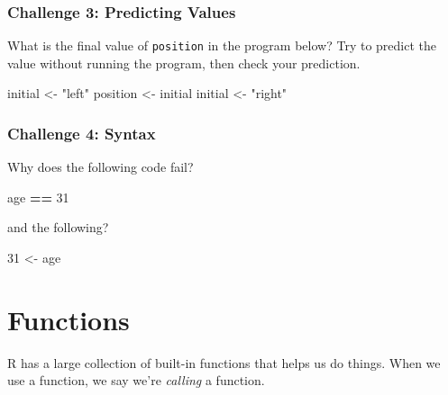 \documentclass[]{book}
\newenvironment{Shaded}{\begin{snugshade}}{\end{snugshade}}
\newcommand{\DecValTok}[1]{\textcolor[rgb]{0.00,0.00,0.81}{#1}}
\newcommand{\NormalTok}[1]{#1}
\newcommand{\OperatorTok}[1]{\textcolor[rgb]{0.81,0.36,0.00}{\textbf{#1}}}
\newcommand{\StringTok}[1]{\textcolor[rgb]{0.31,0.60,0.02}{#1}}
\begin{document}
\hypertarget{challenge-3-predicting-values}{%
\subsubsection*{Challenge 3: Predicting Values}\label{challenge-3-predicting-values}}

What is the final value of \texttt{position} in the program below? Try to predict the value without running the program, then check your prediction.

\begin{Shaded}
\begin{Highlighting}[]
\NormalTok{initial <-}\StringTok{ "left"}
\NormalTok{position <-}\StringTok{ }\NormalTok{initial}
\NormalTok{initial <-}\StringTok{ "right"}
\end{Highlighting}
\end{Shaded}

\hypertarget{challenge-4-syntax}{%
\subsubsection*{Challenge 4: Syntax}\label{challenge-4-syntax}}

Why does the following code fail?

\begin{Shaded}
\begin{Highlighting}[]
\NormalTok{age }\OperatorTok{==}\StringTok{ }\DecValTok{31}
\end{Highlighting}
\end{Shaded}

and the following?

\begin{Shaded}
\begin{Highlighting}[]
\DecValTok{31}\NormalTok{ <-}\StringTok{  }\NormalTok{age}
\end{Highlighting}
\end{Shaded}

\hypertarget{functions}{%
\section{Functions}\label{functions}}

R has a large collection of built-in functions that helps us do things. When we use a function, we say we're \emph{calling} a function.
\end{document}
